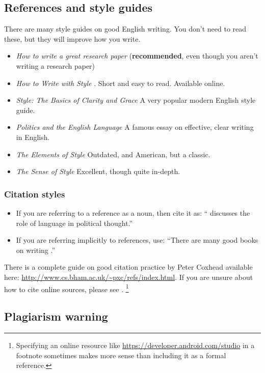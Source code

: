 \subsection{References and style guides}
There are many style guides on good English writing. You don't need to
read these, but they will improve how you write.

\begin{itemize}
    \item
    \emph{How to write a great research paper} \cite{Pey17} (\textbf{recommended}, even though you aren't writing a research paper)
    \item
    \emph{How to Write with Style} \cite{Von80}. Short and easy to read. Available online.
    \item
    \emph{Style: The Basics of Clarity and Grace} \cite{Wil09} A very popular modern English style guide.
    \item
    \emph{Politics and the English Language} \cite{Orw68}  A famous essay on effective, clear writing in English.
    \item
    \emph{The Elements of Style} \cite{StrWhi07} Outdated, and American, but a classic.
    \item
    \emph{The Sense of Style} \cite{Pin15} Excellent, though quite in-depth.
\end{itemize}

\subsubsection{Citation styles}

\begin{itemize}
\item If you are referring to a reference as a noun, then cite it as: ``\citet{Orw68} discusses the role of language in political thought.''
\item If you are referring implicitly to references, use: ``There are many good books on writing \citep{Orw68, Wil09, Pin15}.''
\end{itemize}

There is a complete guide on good citation practice by Peter Coxhead available here: \url{http://www.cs.bham.ac.uk/~pxc/refs/index.html}. 
If you are unsure about how to cite online sources, please see \citet{UNSWWebsite}. 
\footnote{Specifying an online resource like \url{https://developer.android.com/studio}
in a footnote sometimes makes more sense than including it as a formal reference.}

\subsection{Plagiarism warning}

